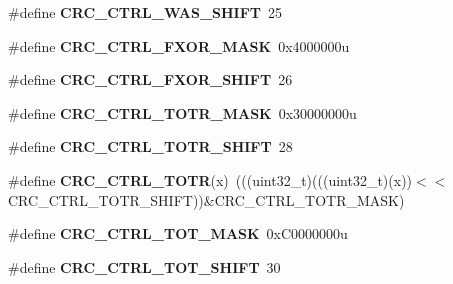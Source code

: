\begin{DoxyCompactItemize}
\item 
\#define {\bfseries C\+R\+C\+\_\+\+C\+T\+R\+L\+\_\+\+W\+A\+S\+\_\+\+S\+H\+I\+FT}~25\hypertarget{group__CRC__Register__Masks_gaf0d0849f057da668b51b759b7a2ba70f}{}\label{group__CRC__Register__Masks_gaf0d0849f057da668b51b759b7a2ba70f}

\item 
\#define {\bfseries C\+R\+C\+\_\+\+C\+T\+R\+L\+\_\+\+F\+X\+O\+R\+\_\+\+M\+A\+SK}~0x4000000u\hypertarget{group__CRC__Register__Masks_ga7c59a3459d15bbbf8ae8bbcc208a1b31}{}\label{group__CRC__Register__Masks_ga7c59a3459d15bbbf8ae8bbcc208a1b31}

\item 
\#define {\bfseries C\+R\+C\+\_\+\+C\+T\+R\+L\+\_\+\+F\+X\+O\+R\+\_\+\+S\+H\+I\+FT}~26\hypertarget{group__CRC__Register__Masks_ga99bb491c03e22125b5053167bf361218}{}\label{group__CRC__Register__Masks_ga99bb491c03e22125b5053167bf361218}

\item 
\#define {\bfseries C\+R\+C\+\_\+\+C\+T\+R\+L\+\_\+\+T\+O\+T\+R\+\_\+\+M\+A\+SK}~0x30000000u\hypertarget{group__CRC__Register__Masks_ga1af35cbb29862b18aee64fd4f32bca07}{}\label{group__CRC__Register__Masks_ga1af35cbb29862b18aee64fd4f32bca07}

\item 
\#define {\bfseries C\+R\+C\+\_\+\+C\+T\+R\+L\+\_\+\+T\+O\+T\+R\+\_\+\+S\+H\+I\+FT}~28\hypertarget{group__CRC__Register__Masks_gab309d177a917d972212c78481cf25d4d}{}\label{group__CRC__Register__Masks_gab309d177a917d972212c78481cf25d4d}

\item 
\#define {\bfseries C\+R\+C\+\_\+\+C\+T\+R\+L\+\_\+\+T\+O\+TR}(x)~(((uint32\+\_\+t)(((uint32\+\_\+t)(x))$<$$<$C\+R\+C\+\_\+\+C\+T\+R\+L\+\_\+\+T\+O\+T\+R\+\_\+\+S\+H\+I\+FT))\&C\+R\+C\+\_\+\+C\+T\+R\+L\+\_\+\+T\+O\+T\+R\+\_\+\+M\+A\+SK)\hypertarget{group__CRC__Register__Masks_gad671df568418549570b651209067dcc3}{}\label{group__CRC__Register__Masks_gad671df568418549570b651209067dcc3}

\item 
\#define {\bfseries C\+R\+C\+\_\+\+C\+T\+R\+L\+\_\+\+T\+O\+T\+\_\+\+M\+A\+SK}~0x\+C0000000u\hypertarget{group__CRC__Register__Masks_ga66da08ca8e22cd72c74e4b3cf53df7dd}{}\label{group__CRC__Register__Masks_ga66da08ca8e22cd72c74e4b3cf53df7dd}

\item 
\#define {\bfseries C\+R\+C\+\_\+\+C\+T\+R\+L\+\_\+\+T\+O\+T\+\_\+\+S\+H\+I\+FT}~30\hypertarget{group__CRC__Register__Masks_gaad1005ea5864ca6795a27b3f7db38ea6}{}\label{group__CRC__Register__Masks_gaad1005ea5864ca6795a27b3f7db38ea6}


\end{DoxyCompactItemize}
